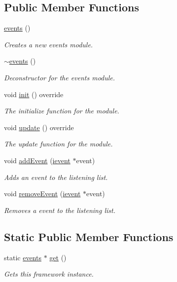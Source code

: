 \subsection*{Public Member Functions}
\begin{DoxyCompactItemize}
\item 
\hyperlink{classflounder_1_1events_ae354f15876d95e28706b1d96dcd790af}{events} ()
\begin{DoxyCompactList}\small\item\em Creates a new events module. \end{DoxyCompactList}\item 
\hyperlink{classflounder_1_1events_aaf446dc74703b8ce1c04f5cf8cb06eed}{$\sim$events} ()
\begin{DoxyCompactList}\small\item\em Deconstructor for the events module. \end{DoxyCompactList}\item 
void \hyperlink{classflounder_1_1events_a3256dce85cd1a62a6126812dab9c4630}{init} () override
\begin{DoxyCompactList}\small\item\em The initialize function for the module. \end{DoxyCompactList}\item 
void \hyperlink{classflounder_1_1events_a7fc08fdb5dc615a924dd0d55996747dc}{update} () override
\begin{DoxyCompactList}\small\item\em The update function for the module. \end{DoxyCompactList}\item 
void \hyperlink{classflounder_1_1events_a6cb8ff41cf2fbf6a92ca78c122f07eb9}{add\+Event} (\hyperlink{classflounder_1_1ievent}{ievent} $\ast$event)
\begin{DoxyCompactList}\small\item\em Adds an event to the listening list. \end{DoxyCompactList}\item 
void \hyperlink{classflounder_1_1events_a957a88d282b2caa50cc87bbe039de095}{remove\+Event} (\hyperlink{classflounder_1_1ievent}{ievent} $\ast$event)
\begin{DoxyCompactList}\small\item\em Removes a event to the listening list. \end{DoxyCompactList}\end{DoxyCompactItemize}
\subsection*{Static Public Member Functions}
\begin{DoxyCompactItemize}
\item 
static \hyperlink{classflounder_1_1events}{events} $\ast$ \hyperlink{classflounder_1_1events_aba09dc039ab9ddb860932a3f8d964f1e}{get} ()
\begin{DoxyCompactList}\small\item\em Gets this framework instance. \end{DoxyCompactList}\end{DoxyCompactItemize}
